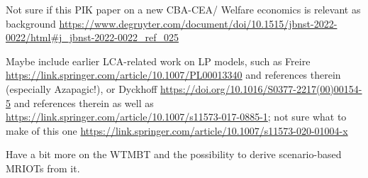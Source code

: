 Not sure if this PIK paper on a new CBA-CEA/ Welfare economics is relevant as background \url{https://www.degruyter.com/document/doi/10.1515/jbnst-2022-0022/html#j_jbnst-2022-0022_ref_025}

Maybe include earlier LCA-related work on LP models, such as Freire \url{https://link.springer.com/article/10.1007/PL00013340} and references therein (especially Azapagic!), or Dyckhoff \url{https://doi.org/10.1016/S0377-2217(00)00154-5} and references therein as well as \url{https://link.springer.com/article/10.1007/s11573-017-0885-1}; not sure what to make of this one \url{https://link.springer.com/article/10.1007/s11573-020-01004-x}

Have a bit more on the WTMBT and the possibility to derive scenario-based MRIOTs from it.